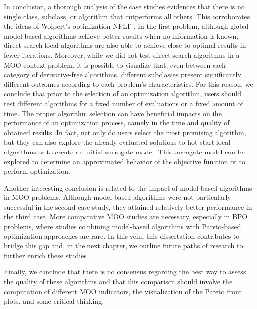 In conclusion, a thorough analysis of the case studies evidences that there is no single class, subclass, or algorithm that outperforms all others. This corroborates the ideas of Wolpert's optimization \ac{NFLT} \cite{Wolpert1997NFLT}. In the first problem, although global model-based algorithms achieve better results when no information is known, direct-search local algorithms are also able to achieve close to optimal results in fewer iterations. Moreover, while we did not test direct-search algorithms in a \ac{MOO} context problem, it is possible to visualize that, even between each category of derivative-free algorithms, %
different subclasses present significantly different outcomes according to each problem's characteristics. For this reason, we conclude that prior to the selection of an optimization algorithm, users should test different algorithms for a fixed number of evaluations or a fixed amount of time. The proper algorithm selection can have beneficial impacts on the performance of an optimization process, namely in the time and quality of obtained results. In fact, not only do users select the most promising algorithm, but they can also explore the already evaluated solutions to hot-start local algorithms or to create an initial surrogate model. This surrogate model can be explored to determine an approximated behavior of the objective function or to perform optimization. 

Another interesting conclusion is related to the impact of model-based algorithms in \ac{MOO} problems. Although model-based algorithms were not particularly successful in the second case study, they attained relatively better performance in the third case. More comparative \ac{MOO} studies are necessary, especially in \ac{BPO} problems, where studies combining model-based algorithms with Pareto-based optimization approaches are rare. In this vein, this dissertation contributes to bridge this gap and, in the next chapter, we outline future paths of research to further enrich these studies.

Finally, we conclude that there is no consensus regarding the best way to assess the quality of these algorithms and that this comparison should involve the computation of different \ac{MOO} indicators, the visualization of the Pareto front plots, and some critical thinking. 